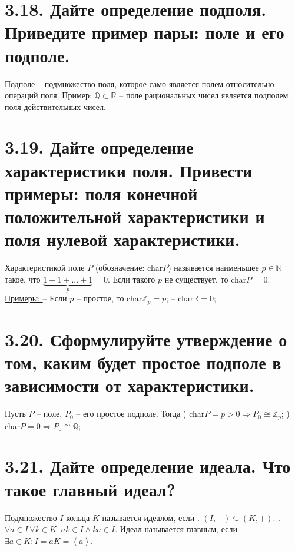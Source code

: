 \documentclass{article}
\begin{document}
\section*{\LARGE 3.18. Дайте определение подполя. Приведите пример пары: поле и его подполе. }
Подполе -- подмножество поля, которое само является полем относительно операций поля.
\newline \underline{Пример:} $\mathbb{Q} \subset \mathbb{R}$ -- поле рациональных чисел является подполем поля действительных чисел.   

\section*{\LARGE 3.19. Дайте определение характеристики поля. Привести примеры: поля конечной положительной характеристики и поля нулевой характеристики. }
Характеристикой поле $P$ (обозначение: char$P$) называется наименьшее $p \in \mathbb{N}$ такое, что $\underbrace{1 + 1 + ... + 1}_{p} = 0$. Если такого $p$ не существует, то char$P$ = 0.
\newline \underline{Примеры: }
\newline -- Если $p$ -- простое, то char$\mathbb{Z}_p = p$;
\newline -- char$\mathbb{R} = 0$;

\section*{\LARGE 3.20. Сформулируйте утверждение о том, каким будет простое подполе в зависимости от характеристики. }
Пусть $P$ -- поле, $P_0$ -- его простое подполе. Тогда 
\newline{}) char$P = p > 0 \Rightarrow P_0 \cong \mathbb{Z}_p$;
\newline{}) char$P = 0 \Rightarrow P_0 \cong \mathbb{Q}$;

\section*{\LARGE 3.21. Дайте определение идеала. Что такое главный идеал? }
Подмножество $I$ кольца $K$ называется идеалом, если 
\newline{}. $(I, +) \subseteq (K, +)$.
\newline{}. $\forall a \in I\,\forall k \in K \;\; ak \in I \wedge ka \in I$.
\newline Идеал называется главным, если $\exists a \in K : I = aK = \left<a\right>$.
\end{document}
